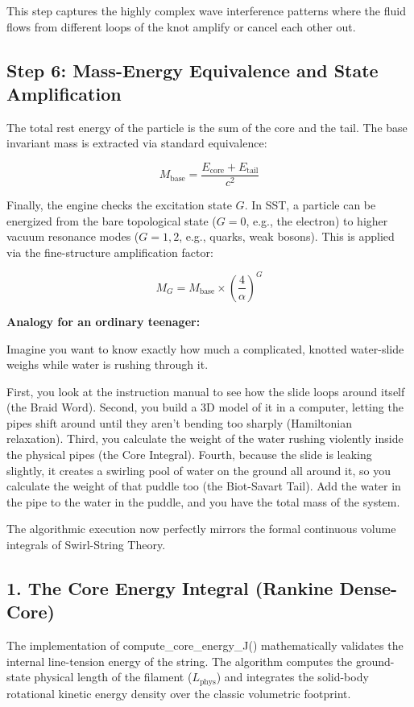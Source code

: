 \documentclass[11pt]{article}
\begin{document}
This step captures the highly complex wave interference patterns where the fluid flows from different loops of the knot amplify or cancel each other out.

\subsection*{Step 6: Mass-Energy Equivalence and State Amplification}
The total rest energy of the particle is the sum of the core and the tail. The base invariant mass is extracted via standard equivalence:

\begin{equation}
M_{\text{base}} = \frac{E_{\text{core}} + E_{\text{tail}}}{c^2}
\end{equation}

Finally, the engine checks the excitation state $G$. In SST, a particle can be energized from the bare topological state ($G=0$, e.g., the electron) to higher vacuum resonance modes ($G=1, 2$, e.g., quarks, weak bosons). This is applied via the fine-structure amplification factor:

\begin{equation}
M_G = M_{\text{base}} \times \left( \frac{4}{\alpha} \right)^G
\end{equation}

\textbf{Analogy for an ordinary teenager:}

Imagine you want to know exactly how much a complicated, knotted water-slide weighs while water is rushing through it.

First, you look at the instruction manual to see how the slide loops around itself (the Braid Word). Second, you build a 3D model of it in a computer, letting the pipes shift around until they aren't bending too sharply (Hamiltonian relaxation). Third, you calculate the weight of the water rushing violently inside the physical pipes (the Core Integral). Fourth, because the slide is leaking slightly, it creates a swirling pool of water on the ground all around it, so you calculate the weight of that puddle too (the Biot-Savart Tail). Add the water in the pipe to the water in the puddle, and you have the total mass of the system.



The algorithmic execution now perfectly mirrors the formal continuous volume integrals of Swirl-String Theory.

\subsection*{1. The Core Energy Integral (Rankine Dense-Core)}
The implementation of compute_core_energy_J() mathematically validates the internal line-tension energy of the string. The algorithm computes the ground-state physical length of the filament ($L_{\text{phys}}$) and integrates the solid-body rotational kinetic energy density over the classic volumetric footprint.
\end{document}
